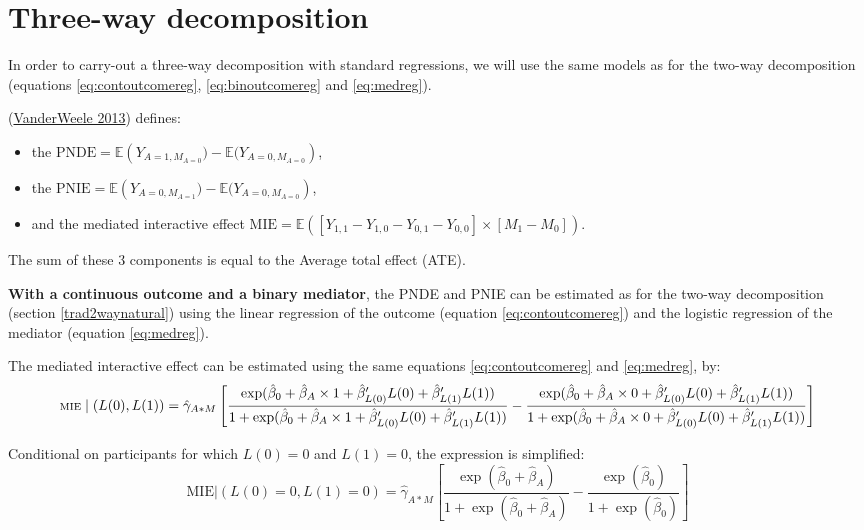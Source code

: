 \documentclass[
]{book}
\providecommand{\tightlist}{%
  \setlength{\itemsep}{0pt}\setlength{\parskip}{0pt}}
\begin{document}
\hypertarget{trad3way}{%
\section{Three-way decomposition}\label{trad3way}}

In order to carry-out a three-way decomposition with standard regressions, we will use the same models as for the two-way decomposition (equations \eqref{eq:contoutcomereg}, \eqref{eq:binoutcomereg} and \eqref{eq:medreg}).

(\protect\hyperlink{ref-vanderweele2013}{VanderWeele 2013}) defines:

\begin{itemize}
\tightlist
\item
  the \(\text{PNDE} = \mathbb{E}\left(Y_{A=1,M_{A=0}}) - \mathbb{E}(Y_{A=0,M_{A=0}}\right)\),
\item
  the \(\text{PNIE} = \mathbb{E}\left(Y_{A=0,M_{A=1}}) - \mathbb{E}(Y_{A=0,M_{A=0}}\right)\),
\item
  and the mediated interactive effect \(\text{MIE} = \mathbb{E}\left( \left[ Y_{1,1} - Y_{1,0} - Y_{0,1} - Y_{0,0}\right] \times \left[M_1 - M_0 \right]\right)\).
\end{itemize}

The sum of these 3 components is equal to the Average total effect (ATE).

\textbf{With a continuous outcome and a binary mediator}, the PNDE and PNIE can be estimated as for the two-way decomposition (section \ref{trad2waynatural}) using the linear regression of the outcome (equation \eqref{eq:contoutcomereg}) and the logistic regression of the mediator (equation \eqref{eq:medreg}).

The mediated interactive effect can be estimated using the same equations \eqref{eq:contoutcomereg} and \eqref{eq:medreg}, by:
\[ \scriptsize \text{MIE} \mid (L(0), L(1)) = \hat{\gamma}_{A \ast M} \left[ \frac{\exp (\hat{\beta}_0 + \hat{\beta}_A \times 1 + \hat{\beta}_{L(0)}^\prime L(0) + \hat{\beta}_{L(1)}^\prime L(1))}{1 + \exp (\hat{\beta}_0 + \hat{\beta}_A \times 1 + \hat{\beta}_{L(0)}^\prime L(0) + \hat{\beta}_{L(1)}^\prime L(1))} - \frac{\exp (\hat{\beta}_0 + \hat{\beta}_A \times 0 + \hat{\beta}_{L(0)}^\prime L(0) + \hat{\beta}_{L(1)}^\prime L(1))}{1 + \exp (\hat{\beta}_0 + \hat{\beta}_A \times 0 + \hat{\beta}_{L(0)}^\prime L(0) + \hat{\beta}_{L(1)}^\prime L(1))}\right]\]

Conditional on participants for which \(L(0)=0\) and \(L(1)=0\), the expression is simplified:
\[\text{MIE} \Big| (L(0)=0, L(1)=0) = \hat{\gamma}_{A \ast M} \left[ \frac{\exp (\hat{\beta}_0 + \hat{\beta}_A )}{1 + \exp (\hat{\beta}_0 + \hat{\beta}_A )} - \frac{\exp (\hat{\beta}_0)}{1 + \exp (\hat{\beta}_0)}\right]\]
\end{document}
